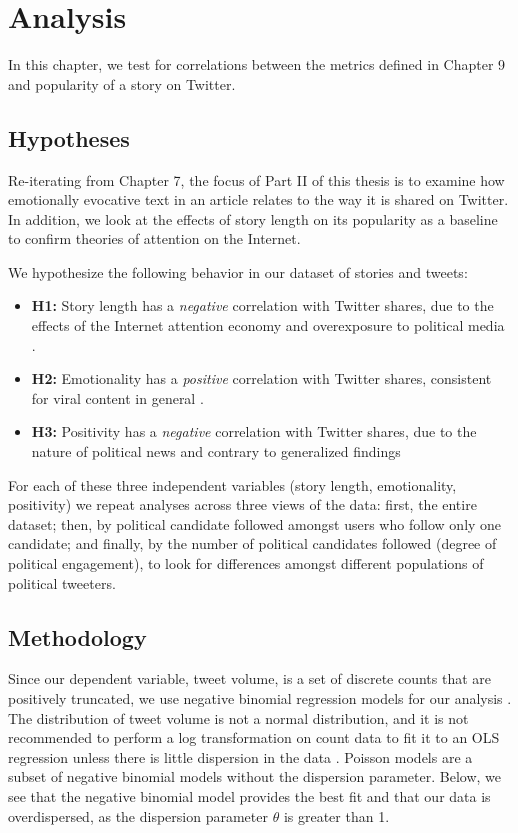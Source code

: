 
\chapter{Analysis}
In this chapter, we test for correlations between the metrics defined in Chapter 9 and popularity of a story on Twitter.

\section{Hypotheses}
Re-iterating from Chapter 7, the focus of Part II of this thesis is to examine how emotionally evocative text in an article relates to the way it is shared on Twitter. In addition, we look at the effects of story length on its popularity as a baseline to confirm theories of attention on the Internet.

 
We hypothesize the following behavior in our dataset of stories and tweets:

\begin{itemize} 
    \item \textbf{H1:} Story length has a \emph{negative} correlation with Twitter shares, due to the effects of the Internet attention economy and overexposure to political media \cite{goldhaber1997attention}.
    \item \textbf{H2:} Emotionality has a \emph{positive} correlation with Twitter shares, consistent for viral content in general \cite{berger2012makes}.
    \item \textbf{H3:} Positivity has a \emph{negative} correlation with Twitter shares, due to the nature of political news and contrary to generalized findings \cite{berger2012makes}

\end{itemize}

For each of these three independent variables (story length, emotionality, positivity) we repeat analyses across three views of the data: first, the entire dataset; then, by political candidate followed amongst users who follow only one candidate; and finally, by the number of political candidates followed (degree of political engagement), to look for differences amongst different populations of political tweeters.


\section{Methodology}

Since our dependent variable, tweet volume, is a set of discrete counts that are positively truncated, we use negative binomial regression models for our analysis \cite{scott1997regression}. The distribution of tweet volume is not a normal distribution, and it is not recommended to perform a log transformation on count data to fit it to an OLS regression unless there is little dispersion in the data \cite{o2010not}. Poisson models are a subset of negative binomial models without the dispersion parameter. Below, we see that the negative binomial model provides the best fit and that our data is overdispersed, as the dispersion parameter $\theta$ is greater than 1.   

